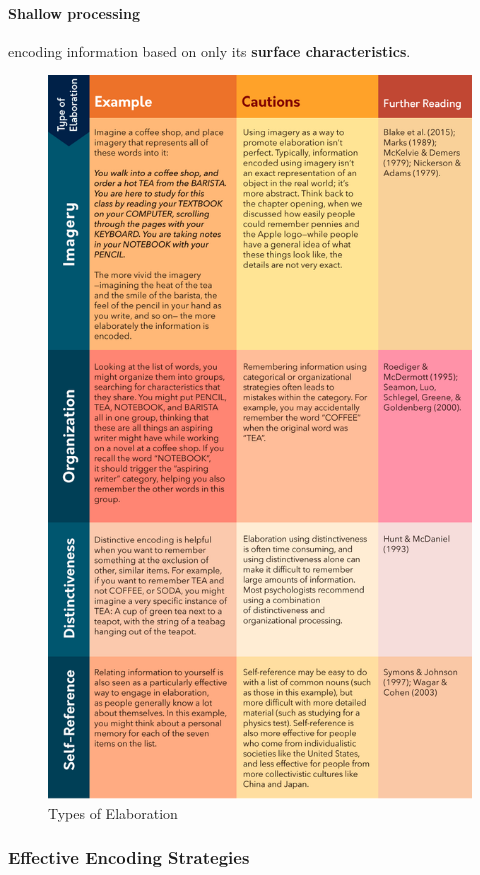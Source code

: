 \documentclass{article}
\begin{document}
	\paragraph{Shallow processing} encoding information based on only its \textbf{surface characteristics}.
	\begin{figure}
		\centering
		\includegraphics[width = \linewidth]{pic/elaboration_types}
		\caption{Types of Elaboration}
	\end{figure}
	\subsubsection{Effective Encoding Strategies}
\end{document}
